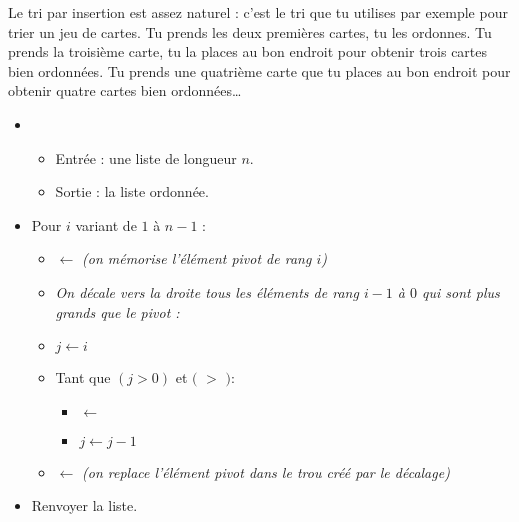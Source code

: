 \documentclass[11pt,class=report,crop=false]{standalone}
\begin{document}
\begin{activite}


Le tri par insertion est assez naturel : c'est le tri que tu utilises par exemple pour trier un jeu de cartes. 
Tu prends les deux premières cartes, tu les ordonnes. Tu prends la troisième carte, tu la places au bon endroit pour obtenir trois cartes bien ordonnées. Tu prends une quatrième carte que tu places au bon endroit pour obtenir quatre cartes bien ordonnées\ldots

	\begin{algorithme}
	\sauteligne 	
	\begin{itemize}
		\item 
		\begin{itemize}
			\item Entrée : une liste de longueur $n$.				
			\item Sortie : la liste ordonnée.				
		\end{itemize}
		
		\item Pour $i$ variant de $1$ à $n-1$ :
		\begin{itemize} 
			\item {} $\leftarrow$  \quad  \emph{(on mémorise l'élément pivot de rang $i$)}
			\item \emph{On décale vers la droite tous les éléments de rang $i-1$ à $0$ qui sont plus grands que le pivot :}  
			\item $j \leftarrow i$
			\item Tant que $(j>0)$ et $($ $>$ $)$:
			\begin{itemize}
				\item {} $\leftarrow$ 
				\item $j \leftarrow j-1$
			\end{itemize}
			\item {} $\leftarrow$  \quad  \emph{(on replace l'élément pivot dans le trou créé par le décalage)}
		\end{itemize}			
		
		\item Renvoyer la liste.			
	\end{itemize}
\end{algorithme} 

	\bigskip


\end{activite}
\end{document}
